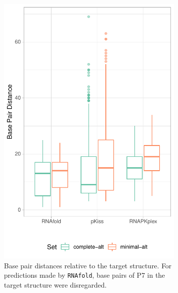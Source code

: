 \documentclass[../../master.tex]{subfiles}
\begin{document}
\begin{figure}[!ht]
\begin{subfigure}[t]{0.2\textwidth}
{		}\label{fig:stats_alt:b}
	\end{subfigure}%
	\begin{subfigure}[t]{0.27\textwidth}
		\centering
		\includegraphics[width=\textwidth]{pic/results/designs/boxplots/alt-bp-boxplot.pdf}
		\caption{Base pair distances relative to the target structure. For predictions made by \texttt{RNAfold}, base pairs of P7 in the target structure were disregarded.
		}\label{fig:stats_alt:c}
	\end{subfigure}
	\begin{subfigure}[t]{0.27\textwidth}
		\centering

\end{subfigure}
\end{figure}
\end{document}
